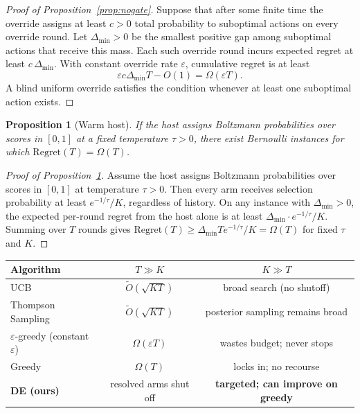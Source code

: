 \documentclass{article}
\newtheorem{proposition} {Proposition}
\begin{document}
\begin{proof}[Proof of Proposition~\ref{prop:nogate}]
Suppose that after some finite time the override assigns at least $c>0$ total probability to suboptimal actions on every override round.
Let $\Delta_{\min}>0$ be the smallest positive gap among suboptimal actions that receive this mass.
Each such override round incurs expected regret at least $c\,\Delta_{\min}$.
With constant override rate $\varepsilon$, cumulative regret is at least
\[
  \varepsilon c\Delta_{\min}T - O(1)
  =
  \Omega(\varepsilon T).
\]
A blind uniform override satisfies the condition whenever at least one suboptimal action exists.
\end{proof}

\begin{proposition}[Warm host]
\label{prop:warm}
If the host assigns Boltzmann probabilities over scores in $[0,1]$ at a fixed temperature $\tau > 0$, there exist Bernoulli instances for which $\mathrm{Regret}(T) = \Omega(T)$.
\end{proposition}

\begin{proof}[Proof of Proposition~\ref{prop:warm}]
Assume the host assigns Boltzmann probabilities over scores in $[0,1]$ at temperature $\tau > 0$.
Then every arm receives selection probability at least $e^{-1/\tau}/K$, regardless of history.
On any instance with $\Delta_{\min} > 0$, the expected per-round regret from the host alone is at least $\Delta_{\min} \cdot e^{-1/\tau}/K$.
Summing over $T$ rounds gives $\mathrm{Regret}(T) \ge \Delta_{\min} T e^{-1/\tau}/K = \Omega(T)$ for fixed $\tau$ and $K$.
\end{proof}

\begin{center}
\renewcommand{\arraystretch}{1.35}
\small
\begin{tabular}{lcc}
\toprule
\textbf{Algorithm} & $T \gg K$ & $K \gg T$ \\
\midrule
UCB & $\tilde{O}(\sqrt{KT})$ & broad search (no shutoff) \\
Thompson Sampling & $\tilde{O}(\sqrt{KT})$ & posterior sampling remains broad \\
$\varepsilon$-greedy (constant $\varepsilon$) & $\Omega(\varepsilon T)$ & wastes budget; never stops \\
Greedy & $\Omega(T)$ & locks in; no recourse \\
\textbf{DE (ours)} & resolved arms shut off & \textbf{targeted; can improve on greedy} \\
\bottomrule
\end{tabular}
\end{center}
\end{document}

